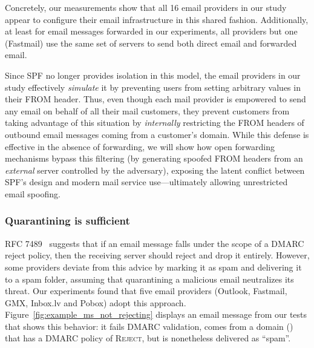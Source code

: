 Concretely, our measurements show that all 16 email providers in our study appear to configure their email infrastructure in this shared fashion.
Additionally, at least for email messages forwarded in our experiments, all providers but one (Fastmail) use the same set of servers to send both direct email and forwarded email.

Since SPF no longer provides isolation in this model, the email
providers in our study effectively \emph{simulate} it by preventing users
from setting arbitrary values in their \textsc{FROM} header.  Thus,
even though each mail provider is empowered to send any email on
behalf of all their mail customers, they prevent customers from taking
advantage of this situation by \emph{internally} restricting the \textsc{FROM} headers of outbound email messages coming from a customer's domain.
While this defense is effective in the absence of forwarding, we will
show how open forwarding mechanisms bypass this filtering (by generating spoofed \textsc{FROM} headers from an \emph{external} server controlled by the adversary),
exposing the latent conflict between SPF's design and modern mail service
use---ultimately allowing unrestricted email spoofing.



\subsubsection{Quarantining is sufficient}
\label{subsubsec:quarantine_instead_of_reject}
RFC 7489~\cite{rfc5231} suggests that if an email message falls under the scope of a DMARC reject policy, then the receiving server should reject and drop it entirely. However, some providers deviate from this advice by marking it as spam and delivering it to a spam folder, assuming that quarantining a malicious email neutralizes its threat.
Our experiments found that five email providers (Outlook, Fastmail, GMX, Inbox.lv and Pobox) adopt this approach.
Figure~\ref{fig:example_ms_not_rejecting} displays an email message from our tests that shows this behavior: it fails DMARC validation, comes from a domain () that has a DMARC policy of \textsc{Reject}, but is nonetheless delivered
as ``spam''.

